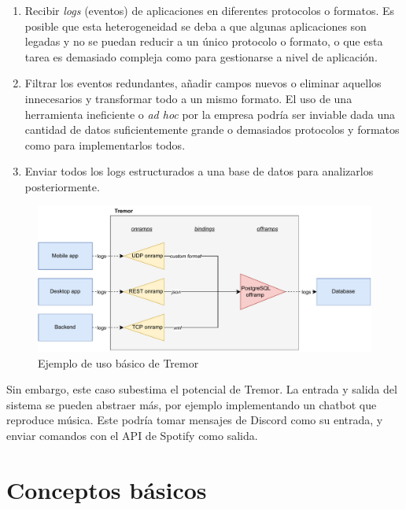 \begin{enumerate}
    \item Recibir \emph{logs} (eventos) de aplicaciones en diferentes protocolos
        o formatos. Es posible que esta heterogeneidad se deba a que algunas
        aplicaciones son legadas y no se puedan reducir a un único protocolo o
        formato, o que esta tarea es demasiado compleja como para gestionarse a
        nivel de aplicación.

    \item Filtrar los eventos redundantes, añadir campos nuevos o eliminar
        aquellos innecesarios y transformar todo a un mismo formato. El uso de
        una herramienta ineficiente o \emph{ad hoc} por la empresa podría ser
        inviable dada una cantidad de datos suficientemente grande o demasiados
        protocolos y formatos como para implementarlos todos.

    \item Enviar todos los logs estructurados a una base de datos para
        analizarlos posteriormente.

\end{enumerate}

\begin{figure}
    \centering
    \includegraphics[width=\textwidth]{./Imagenes/example.pdf}
    \caption{Ejemplo de uso básico de Tremor}%
    \label{fig:tremor_example}
\end{figure}

Sin embargo, este caso subestima el potencial de Tremor. La entrada y salida del
sistema se pueden abstraer más, por ejemplo implementando un chatbot que
reproduce música. Este podría tomar mensajes de Discord como su entrada, y
enviar comandos con el API de Spotify como salida.

\section{Conceptos básicos}

